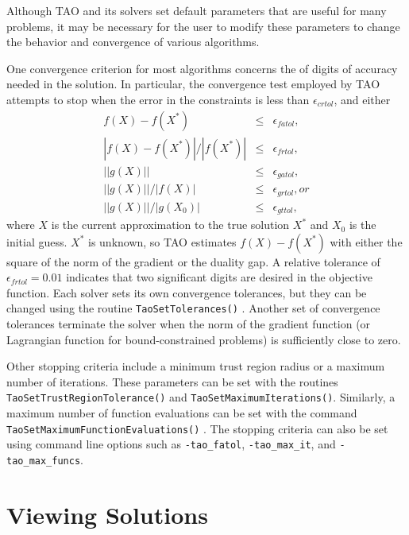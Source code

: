 Although TAO and its solvers set default parameters 
that are useful
for many problems, it may be necessary for the user to modify these
parameters to change the behavior and convergence of various algorithms.

One convergence criterion for most algorithms concerns the
of digits of accuracy needed in the solution.  In particular,
the convergence test employed by TAO attempts to stop when
the error in the constraints is less than $\epsilon_{crtol}$,
 and either
\[
\begin{array}{lcl}
f(X) - f(X^*)  &\leq& \epsilon_{fatol}, \\
|f(X) - f(X^*)| / |f(X^*)| &\leq& \epsilon_{frtol},\\
||g(X)|| &\leq& \epsilon_{gatol}, \\
||g(X)||/|f(X)| &\leq& \epsilon_{grtol}, or \\
||g(X)||/|g(X_0)| &\leq& \epsilon_{gttol},
\end{array}
\]
where $X$ is the current approximation to the true solution $X^*$
and $X_0$ is the initial guess.
$X^*$ is unknown, so TAO estimates $f(X) - f(X^*)$ with either 
the square of the norm of the gradient or the duality gap.
A relative tolerance of $\epsilon_{frtol}=0.01$ indicates that two
significant digits are desired in the objective function.
Each solver sets its own  convergence tolerances, but they can
be changed using the routine
{\tt TaoSetTolerances()} 
. 
Another set of convergence tolerances 
terminate the solver when the norm of the gradient function
(or Lagrangian function for bound-constrained problems)
is sufficiently close to zero.

Other stopping criteria include a minimum trust region radius or 
a maximum number of iterations.  These parameters can be set with
the routines {\tt Tao\-Set\-Trust\-Region\-Tolerance()}
and {\tt Tao\-Set\-Max\-imum\-Iter\-ations()}.
Similarly, a maximum number of function evaluations can be set 
with the command 
{\tt Tao\-Set\-Max\-imum\-Func\-tion\-Evaluations()}
.  The stopping criteria can
also be set using command line options such as \texttt{-tao\_fatol}, 
\texttt{-tao\_max\_it}, and \texttt{-tao\_max\_funcs}.

\section{Viewing Solutions}

